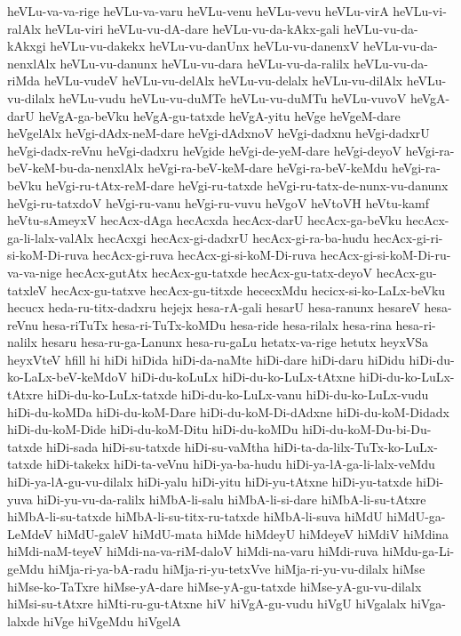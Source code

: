 {heVLu-va-va-rige
heVLu-va-varu
heVLu-venu
heVLu-vevu
heVLu-virA
heVLu-vi-ralAlx
heVLu-viri
heVLu-vu-dA-dare
heVLu-vu-da-kAkx-gali
heVLu-vu-da-kAkxgi
heVLu-vu-dakekx
heVLu-vu-danUnx
heVLu-vu-danenxV
heVLu-vu-da-nenxlAlx
heVLu-vu-danunx
heVLu-vu-dara
heVLu-vu-da-ralilx
heVLu-vu-da-riMda
heVLu-vudeV
heVLu-vu-delAlx
heVLu-vu-delalx
heVLu-vu-dilAlx
heVLu-vu-dilalx
heVLu-vudu
heVLu-vu-duMTe
heVLu-vu-duMTu
heVLu-vuvoV
heVgA-darU
heVgA-ga-beVku
heVgA-gu-tatxde
heVgA-yitu
heVge
heVgeM-dare
heVgelAlx
heVgi-dAdx-neM-dare
heVgi-dAdxnoV
heVgi-dadxnu
heVgi-dadxrU
heVgi-dadx-reVnu
heVgi-dadxru
heVgide
heVgi-de-yeM-dare
heVgi-deyoV
heVgi-ra-beV-keM-bu-da-nenxlAlx
heVgi-ra-beV-keM-dare
heVgi-ra-beV-keMdu
heVgi-ra-beVku
heVgi-ru-tAtx-reM-dare
heVgi-ru-tatxde
heVgi-ru-tatx-de-nunx-vu-danunx
heVgi-ru-tatxdoV
heVgi-ru-vanu
heVgi-ru-vuvu
heVgoV
heVtoVH
heVtu-kamf
heVtu-sAmeyxV
hecAcx-dAga
hecAcxda
hecAcx-darU
hecAcx-ga-beVku
hecAcx-ga-li-lalx-valAlx
hecAcxgi
hecAcx-gi-dadxrU
hecAcx-gi-ra-ba-hudu
hecAcx-gi-ri-si-koM-Di-ruva
hecAcx-gi-ruva
hecAcx-gi-si-koM-Di-ruva
hecAcx-gi-si-koM-Di-ru-va-va-nige
hecAcx-gutAtx
hecAcx-gu-tatxde
hecAcx-gu-tatx-deyoV
hecAcx-gu-tatxleV
hecAcx-gu-tatxve
hecAcx-gu-titxde
hececxMdu
hecicx-si-ko-LaLx-beVku
hecucx
heda-ru-titx-dadxru
hejejx
hesa-rA-gali
hesarU
hesa-ranunx
hesareV
hesa-reVnu
hesa-riTuTx
hesa-ri-TuTx-koMDu
hesa-ride
hesa-rilalx
hesa-rina
hesa-ri-nalilx
hesaru
hesa-ru-ga-Lanunx
hesa-ru-gaLu
hetatx-va-rige
hetutx
heyxVSa
heyxVteV
hfill
hi
hiDi
hiDida
hiDi-da-naMte
hiDi-dare
hiDi-daru
hiDidu
hiDi-du-ko-LaLx-beV-keMdoV
hiDi-du-koLuLx
hiDi-du-ko-LuLx-tAtxne
hiDi-du-ko-LuLx-tAtxre
hiDi-du-ko-LuLx-tatxde
hiDi-du-ko-LuLx-vanu
hiDi-du-ko-LuLx-vudu
hiDi-du-koMDa
hiDi-du-koM-Dare
hiDi-du-koM-Di-dAdxne
hiDi-du-koM-Didadx
hiDi-du-koM-Dide
hiDi-du-koM-Ditu
hiDi-du-koMDu
hiDi-du-koM-Du-bi-Du-tatxde
hiDi-sada
hiDi-su-tatxde
hiDi-su-vaMtha
hiDi-ta-da-lilx-TuTx-ko-LuLx-tatxde
hiDi-takekx
hiDi-ta-veVnu
hiDi-ya-ba-hudu
hiDi-ya-lA-ga-li-lalx-veMdu
hiDi-ya-lA-gu-vu-dilalx
hiDi-yalu
hiDi-yitu
hiDi-yu-tAtxne
hiDi-yu-tatxde
hiDi-yuva
hiDi-yu-vu-da-ralilx
hiMbA-li-salu
hiMbA-li-si-dare
hiMbA-li-su-tAtxre
hiMbA-li-su-tatxde
hiMbA-li-su-titx-ru-tatxde
hiMbA-li-suva
hiMdU
hiMdU-ga-LeMdeV
hiMdU-galeV
hiMdU-mata
hiMde
hiMdeyU
hiMdeyeV
hiMdiV
hiMdina
hiMdi-naM-teyeV
hiMdi-na-va-riM-daloV
hiMdi-na-varu
hiMdi-ruva
hiMdu-ga-Li-geMdu
hiMja-ri-ya-bA-radu
hiMja-ri-yu-tetxVve
hiMja-ri-yu-vu-dilalx
hiMse
hiMse-ko-TaTxre
hiMse-yA-dare
hiMse-yA-gu-tatxde
hiMse-yA-gu-vu-dilalx
hiMsi-su-tAtxre
hiMti-ru-gu-tAtxne
hiV
hiVgA-gu-vudu
hiVgU
hiVgalalx
hiVga-lalxde
hiVge
hiVgeMdu
hiVgelA
}
